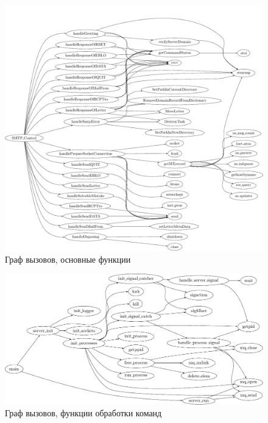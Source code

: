\documentclass[a4paper,12pt]{report}
\begin{document}
\begin{figure}
\centering
\includegraphics[width=\textwidth]{include/ccflow02_dot.pdf}
\caption{Граф вызовов, основные функции}
\label{fig:ccflow02}
\end{figure}

\begin{figure}
\centering
\includegraphics[width=\textwidth]{include/scflow01_dot.pdf}
\caption{Граф вызовов, функции обработки команд}
\label{fig:scflow01}
\end{figure}
\end{document}
